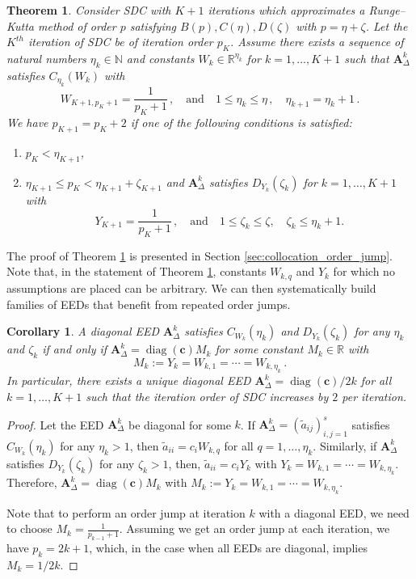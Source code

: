 \documentclass[sn-mathphys-num]{sn-jnl}%
\newcommand{\reva}[1]{#1}%
\newcommand{\revb}[1]{#1}%
\DeclareMathOperator{\diag}{diag}
\theoremstyle{thmstyleone}%
\newtheorem{theorem}{Theorem}%
\newtheorem{corollary}{Corollary}%
\theoremstyle{thmstyletwo}%
\theoremstyle{thmstylethree}%
\begin{document}
\begin{theorem}
    \label{thm:order_jump}
    Consider SDC with $K+1$ iterations which approximates a \reva{Runge--Kutta method of order $p$ satisfying $B(p), C(\eta), D(\zeta)$ with $p = \eta + \zeta$. Let the $K^{th}$ iteration of SDC be of iteration order $p_K$. Assume there exists a sequence of natural numbers $\eta_k \in \mathbb{N}$ and constants $W_k \in \mathbb{R}^{\eta_k}$ for $k=1,\dots, K+1$ such that $\bm{A}^k_\Delta$ satisfies $C_{\eta_k}(W_k)$ with
    \[ W_{K+1,p_K + 1} = \frac{1}{p_K + 1} \,, \quad \text{and} \quad 1 \leq \eta_k \leq \eta \,, \quad \eta_{k+1} = \eta_k + 1 \,. \]
    We have $p_{K+1} = p_K + 2$ if one of the following conditions is satisfied:
    \begin{enumerate}
        \item $p_K < \eta_{K+1}$,
        \item $\eta_{K+1} \leq p_K < \eta_{K+1} + \zeta_{K+1}$ and $\bm{A}_\Delta^k$ satisfies $D_{Y_k}(\zeta_k)$ for $k = 1, \dots, K + 1$ with
            \[ Y_{K+1} = \frac{1}{p_K + 1} \,, \quad \text{and} \quad 1 \leq \zeta_k \leq \zeta, \quad \zeta_k \leq \eta_k + 1. \]
    \end{enumerate}}
\end{theorem}

\reva{The proof of Theorem \ref{thm:order_jump} is presented in Section \ref{sec:collocation_order_jump}. Note that, in the statement of Theorem \ref{thm:order_jump}, constants $W_{k,q}$ and $Y_{k}$ for which no assumptions are placed can be arbitrary. We can then systematically build families of EEDs that benefit from repeated order jumps.}

\begin{corollary}
    \reva{A diagonal EED $\bm{A}_\Delta^k$ satisfies $C_{W_k}(\eta_k)$ and $D_{Y_k}(\zeta_k)$ for any $\eta_k$ and $\zeta_k$ if and only if $\bm{A}^k_\Delta = \diag(\bm{c})M_k$ for some constant $M_k \in \mathbb{R}$  with
        \[ M_k := Y_k = W_{k,1} = \cdots = W_{k,\eta_k} \,. \]
    In particular, there exists a unique diagonal EED $\bm{A}_\Delta^{k} = \diag(\mathbf{c})/2k$ for all $k \reva{= 1, \dots, K+1}$ such that the \reva{iteration} order of SDC increases by $2$ per iteration.}
\end{corollary}
\begin{proof}
    \revb{Let the EED $\bm{A}_\Delta^k$ be diagonal for some $k$. If $\bm{A}_\Delta^k = (\tilde{a}_{ij})_{i,j=1}^s$ satisfies $C_{W_k}(\eta_k)$ for any $\eta_k > 1$, then $\tilde{a}_{ii} = c_i W_{k,q}$ for all $q = 1, \dots, \eta_k$. Similarly, if $\bm{A}_\Delta^k$ satisfies $D_{Y_k}(\zeta_k)$ for any $\zeta_k > 1$, then, $\tilde{a}_{ii} = c_i Y_k$ with $Y_k = W_{k,1} = \cdots = W_{k,\eta_k}$. Therefore, $\bm{A}_\Delta^k = \diag(\bm{c}) M_k$ with $M_k := Y_k = W_{k,1} = \cdots = W_{k,\eta_k}$.}
    
    \revb{Note that to perform an order jump at iteration $k$ with a diagonal EED, we need to choose $M_k = \frac1{p_{k-1} + 1}$. Assuming we get an order jump at each iteration, we have $p_k = 2k + 1$, which, in the case when all EEDs are diagonal, implies $M_k = 1/2k$.}
\end{proof}
\end{document}
